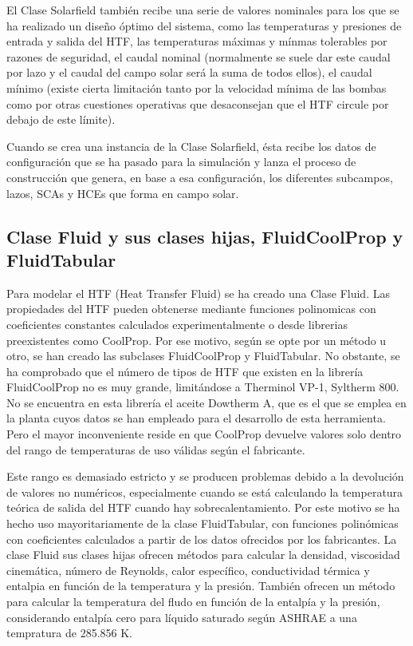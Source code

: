 El Clase Solarfield también recibe una serie de valores nominales para los que se ha realizado un diseño óptimo del sistema, como las temperaturas y presiones de entrada y salida del HTF, las temperaturas máximas y mínmas tolerables por razones de seguridad, el caudal nominal (normalmente se suele dar este caudal por lazo y el caudal del campo solar será la suma de todos ellos), el caudal mínimo (existe cierta limitación tanto por la velocidad mínima de las bombas como por otras
cuestiones operativas que desaconsejan que el HTF circule por debajo de este límite).

Cuando se crea una instancia de la Clase Solarfield, ésta recibe los datos de configuración que se ha pasado para la simulación y lanza el proceso de construcción que genera, en base a esa configuración, los diferentes subcampos, lazos, SCAs y HCEs que forma en campo solar.

\subsection{Clase Fluid y sus clases hijas, FluidCoolProp y FluidTabular}
\label{subclases-fluid}

Para modelar el HTF (Heat Transfer Fluid) se ha creado una Clase Fluid.
Las propiedades del HTF pueden obtenerse mediante funciones polinomicas con coeficientes constantes calculados experimentalmente o desde librerias preexistentes como CoolProp. Por ese motivo, según se opte por un método u otro, se han creado las subclases FluidCoolProp y FluidTabular. No obstante, se ha comprobado que el número de tipos de HTF que existen en la librería FluidCoolProp no es muy grande, limitándose a Therminol VP-1, Syltherm 800. No se encuentra en esta
librería el aceite Dowtherm A, que es el que se emplea en la planta cuyos datos se han empleado para el desarrollo de esta herramienta. Pero el mayor inconveniente reside en que CoolProp devuelve valores solo dentro del rango de temperaturas de uso válidas según el fabricante. 

Este rango es demasiado estricto y se producen problemas debido a la devolución de valores no numéricos, especialmente cuando se está calculando la temperatura teórica de salida del HTF cuando hay sobrecalentamiento. Por este motivo se ha hecho uso mayoritariamente de la clase FluidTabular, con funciones polinómicas con coeficientes calculados a partir de los datos ofrecidos por los fabricantes.  La clase Fluid sus clases hijas ofrecen métodos para calcular la densidad, viscosidad cinemática, número de Reynolds, calor específico, conductividad térmica y entalpia en función de la temperatura y la presión. También ofrecen un método para calcular la temperatura del fludo en función de la entalpía y la presión, considerando entalpía cero para líquido saturado según ASHRAE a una tempratura de 285.856 K.

